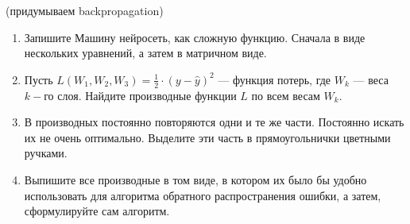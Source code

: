 \begin{problem}{(придумываем backpropagation)}
\begin{enumerate}
	\item  Запишите Машину нейросеть, как сложную функцию. Сначала в виде нескольких уравнений, а затем в матричном виде. 
	
	\item  Пусть $L(W_1, W_2, W_3) = \frac{1}{2} \cdot (y - \hat y)^2$ --- функция потерь, где $W_k$ --- веса $k-$го слоя.  Найдите производные функции $L$ по всем весам $W_k$.
	
	\item В производных постоянно повторяются одни и те же части. Постоянно искать их не очень оптимально. Выделите эти часть в прямоугольнички цветными ручками. 
	
	\item Выпишите все производные в том виде, в котором их было бы удобно использовать для алгоритма обратного распространения ошибки, а затем, сформулируйте сам алгоритм.
\end{enumerate}
\end{problem}




